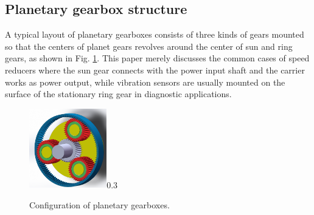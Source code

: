\documentclass[a4paper,fleqn]{cas-sc}%
\begin{document}
\subsection{Planetary gearbox structure}
\par A typical layout of planetary gearboxes consists of three kinds of gears mounted so that the centers of planet gears revolves around the center of sun and ring gears, as shown in Fig. \ref{fig:planetary_gearbox_layout}. This paper merely discusses the common cases of speed reducers where the sun gear connects with the power input shaft and the carrier works as power output, while vibration sensors are usually mounted on the surface of the stationary ring gear in diagnostic applications. 
\begin{figure}[pos=htbp]
    \centering
    \begin{annotate}{\includegraphics[width=0.3\textwidth]{Planetary_Gearbox.PNG}}{0.3}
    \end{annotate}
    \caption{Configuration of planetary gearboxes.}
    \label{fig:planetary_gearbox_layout}
\end{figure}
\end{document}
